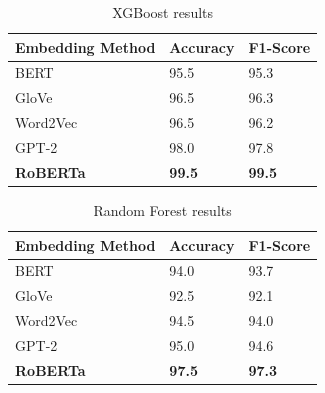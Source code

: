 \begin{table}[hbt!]
\begin{threeparttable}
\caption{XGBoost results}
\label{xgb_results}
\begin{tabular}{lll}
\toprule
\headrow Embedding Method & Accuracy & F1-Score\\
\midrule
 BERT     &       95.5 &       95.3 \\
 GloVe    &       96.5 &       96.3 \\
 Word2Vec &       96.5 &       96.2 \\
 GPT-2    &       98.0 &       97.8 \\
 \textbf{RoBERTa}  &       \textbf{99.5} &       \textbf{99.5} \\
\bottomrule
\end{tabular}
\end{threeparttable}
\end{table}

\begin{table}[hbt!]
\begin{threeparttable}
\caption{Random Forest results}
\label{rf_results}
\begin{tabular}{lll}
\toprule
\headrow Embedding Method & Accuracy & F1-Score\\
\midrule
 BERT     &       94.0 &       93.7 \\
 GloVe    &       92.5 &       92.1 \\
 Word2Vec &       94.5 &       94.0 \\
 GPT-2    &       95.0 &       94.6 \\
 \textbf{RoBERTa}  &       \textbf{97.5} &       \textbf{97.3} \\
\bottomrule
\end{tabular}
\end{threeparttable}
\end{table}

